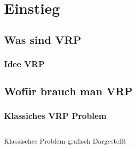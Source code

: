 \section{Einstieg} %



\subsection{Was sind VRP} 
\begin{frame}
\frametitle{Idee VRP}

\end{frame}
\subsection{Wofür brauch man VRP}
\begin{frame}
\frametitle{Klassiches VRP Problem}
\begin{columns}[T] %
\begin{column}{.48\textwidth}
\centering
{} 
    \caption{Klassisches Problem grafisch Dargestellt} \label{CIA}
\end{column}%
\hfill%


\end{columns}
\end{frame}